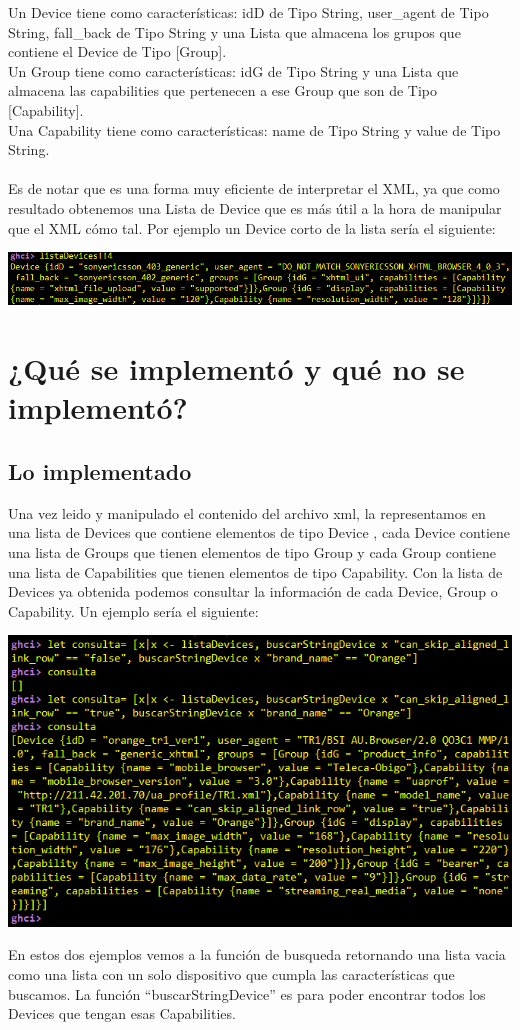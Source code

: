 \documentclass[11pt]{article} %
\begin{document}
Un Device tiene como características:  idD de Tipo String, user\_agent de Tipo String, fall\_back de Tipo String y una Lista que almacena los grupos que contiene el Device de Tipo [Group].\\
Un Group tiene como características: idG de Tipo String y una Lista que almacena las capabilities que pertenecen a ese Group que son de Tipo [Capability].\\
Una Capability tiene como características: name de Tipo String y value de Tipo String.\\ \\
Es de notar que es una forma muy eficiente de interpretar el XML, ya que como resultado obtenemos una Lista de Device que es más útil a la hora de manipular que el XML cómo tal. Por ejemplo un Device corto de la lista sería el siguiente:
\begin{center}
\includegraphics[scale=0.7]{Imagenes/EjempDevice.png}
\end{center}
\section{¿Qué se implementó y qué no se implementó? }
\subsection{Lo implementado} 
Una vez leido y manipulado el contenido del archivo xml, la representamos en una lista de Devices que contiene elementos de tipo Device , cada Device contiene una lista de Groups que tienen elementos de tipo Group y cada Group contiene una lista  de  Capabilities que tienen elementos de tipo Capability.  
Con la lista de Devices  ya obtenida podemos consultar la información de cada Device, Group o Capability. Un ejemplo sería el siguiente:
\begin{center}
\includegraphics[scale=0.7]{Imagenes/Consulta.png}
\end{center}
En estos dos ejemplos vemos a la función de busqueda retornando una lista vacia como una lista con un solo dispositivo que cumpla las características que buscamos. La función ``buscarStringDevice” es para poder encontrar todos los Devices que tengan esas Capabilities.
\end{document}

